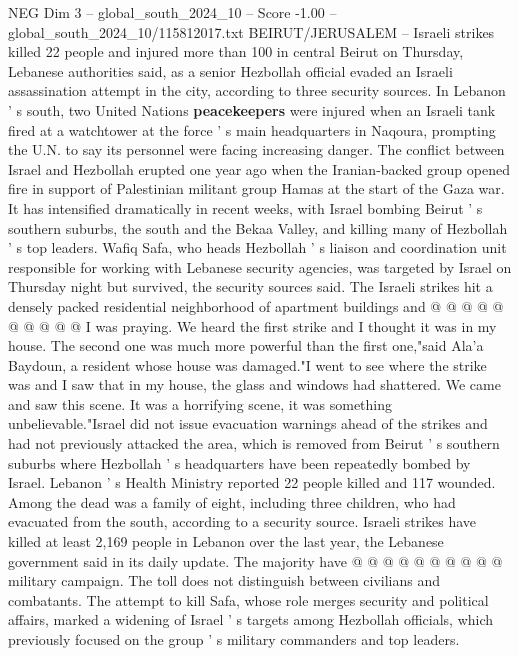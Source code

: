 \begin{textsample}{NEG Dim 3 – global\_south\_2024\_10 – Score -1.00 – global\_south\_2024\_10/115812017.txt}  \label{ex:f3_neg_053}
BEIRUT/JERUSALEM -- Israeli strikes killed 22 people and injured more than 100 in central Beirut on Thursday, Lebanese authorities said, as a senior Hezbollah official evaded an Israeli assassination attempt in the city, according to three security sources.
In Lebanon ' s south, two United Nations \textbf{peacekeepers} were injured when an Israeli tank fired at a watchtower at the force ' s main headquarters in Naqoura, prompting the U.N. to say its personnel were facing increasing danger.
The conflict between Israel and Hezbollah erupted one year ago when the Iranian-backed group opened fire in support of Palestinian militant group Hamas at the start of the Gaza war.
It has intensified dramatically in recent weeks, with Israel bombing Beirut ' s southern suburbs, the south and the Bekaa Valley, and killing many of Hezbollah ' s top leaders.
Wafiq Safa, who heads Hezbollah ' s liaison and coordination unit responsible for working with Lebanese security agencies, was targeted by Israel on Thursday night but survived, the security sources said.
The Israeli strikes hit a densely packed residential neighborhood of apartment buildings and @ @ @ @ @ @ @ @ @ @ I was praying.
We heard the first strike and I thought it was in my house.
The second one was much more powerful than the first one,"said Ala'a Baydoun, a resident whose house was damaged."I went to see where the strike was and I saw that in my house, the glass and windows had shattered.
We came and saw this scene.
It was a horrifying scene, it was something unbelievable."Israel did not issue evacuation warnings ahead of the strikes and had not previously attacked the area, which is removed from Beirut ' s southern suburbs where Hezbollah ' s headquarters have been repeatedly bombed by Israel.
Lebanon ' s Health Ministry reported 22 people killed and 117 wounded.
Among the dead was a family of eight, including three children, who had evacuated from the south, according to a security source.
Israeli strikes have killed at least 2,169 people in Lebanon over the last year, the Lebanese government said in its daily update.
The majority have @ @ @ @ @ @ @ @ @ @ military campaign.
The toll does not distinguish between civilians and combatants.
The attempt to kill Safa, whose role merges security and political affairs, marked a widening of Israel ' s targets among Hezbollah officials, which previously focused on the group ' s military commanders and top leaders.

\end{textsample}
